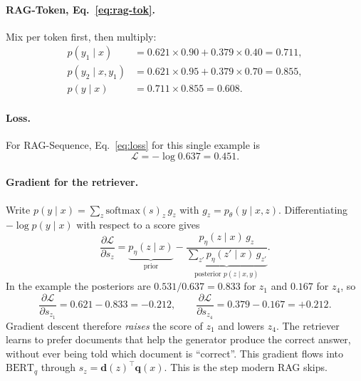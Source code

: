 \documentclass[11pt]{article}
\begin{document}
\paragraph{RAG-Token, Eq.~\eqref{eq:rag-tok}.} Mix per token first, then multiply:
\begin{align}
  p(y_1 \mid x) &= 0.621 \times 0.90 + 0.379 \times 0.40 = 0.711, \\
  p(y_2 \mid x, y_1) &= 0.621 \times 0.95 + 0.379 \times 0.70 = 0.855, \\
  p(y \mid x) &= 0.711 \times 0.855 = 0.608.
\end{align}

\paragraph{Loss.} For RAG-Sequence, Eq.~\eqref{eq:loss} for this single example is
\begin{equation}
  \mathcal{L} = -\log 0.637 = 0.451.
\end{equation}

\paragraph{Gradient for the retriever.}
Write $p(y \mid x) = \sum_z \mathrm{softmax}(s)_z \, g_z$ with $g_z = p_\theta(y \mid x, z)$. Differentiating $-\log p(y \mid x)$ with respect to a score gives
\begin{equation}
  \frac{\partial \mathcal{L}}{\partial s_z}
  = \underbrace{p_\eta(z \mid x)}_{\text{prior}}
  - \underbrace{\frac{p_\eta(z \mid x)\, g_z}{\sum_{z'} p_\eta(z' \mid x)\, g_{z'}}}_{\text{posterior } p(z \mid x, y)}.
\end{equation}
In the example the posteriors are $0.531/0.637 = 0.833$ for $z_1$ and $0.167$ for $z_4$, so
\begin{equation}
  \frac{\partial \mathcal{L}}{\partial s_{z_1}} = 0.621 - 0.833 = -0.212, \qquad
  \frac{\partial \mathcal{L}}{\partial s_{z_4}} = 0.379 - 0.167 = +0.212.
\end{equation}
Gradient descent therefore \emph{raises} the score of $z_1$ and lowers $z_4$. The retriever learns to prefer documents that help the generator produce the correct answer, without ever being told which document is ``correct''. This gradient flows into $\mathrm{BERT}_q$ through $s_z = \mathbf{d}(z)^\top \mathbf{q}(x)$. This is the step modern RAG skips.
\end{document}

